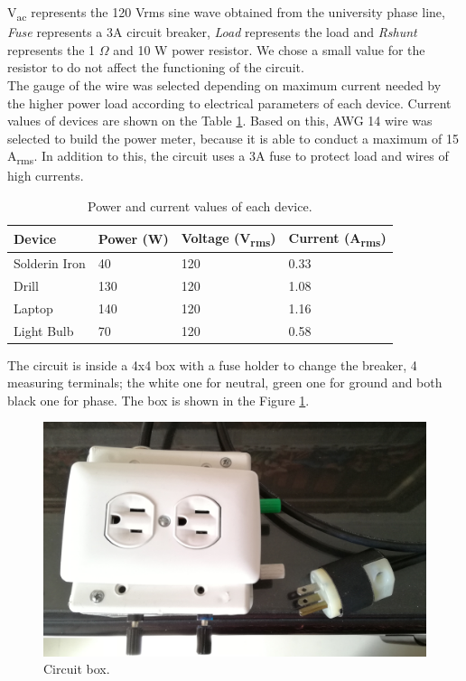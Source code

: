 \documentclass[journal]{IEEEtran}
\begin{document}
V\textsubscript{ac} represents the 120 Vrms sine wave 
obtained from the university phase line, \textit{Fuse}
represents a 3A circuit breaker, \textit{Load} represents 
the load and \textit{Rshunt} 
represents the 1 $\Omega$ and 10 W 
power resistor. We chose a small value for the resistor 
to do not affect the functioning of the circuit. \\

The gauge of the wire was selected depending on maximum 
current needed by the higher power load according to 
electrical parameters 
of each device. Current values of devices are 
shown on the Table \ref{current_table}. Based on this, 
AWG 14 wire was selected to build the power meter, because 
it is able to conduct a maximum of 15 A\textsubscript{rms}.
In addition to this, the circuit uses a 3A fuse to protect
load and wires of high currents.\\

\begin{table}
\centering
\caption{Power and current values of each device.}
\begin{tabular}{|l|p{1.2cm}|p{1.5cm}|p{1.5cm}|}
\hline 
Device & Power (W) & Voltage (V\textsubscript{rms}) 
& Current (A\textsubscript{rms}) \\ \hline 
Solderin Iron 	&  40	& 120 	& 0.33 \\ \hline 
Drill 		& 130	& 120   & 1.08 \\ \hline 
Laptop 		& 140 	& 120   & 1.16 \\ \hline 
Light Bulb		& 70  	& 120   & 0.58 \\ \hline 
\end{tabular}
\label{current_table}
\end{table}

The circuit is inside a 4x4 box with a fuse holder to 
change the breaker, 4 measuring terminals; the white 
one for neutral, green one for ground and 
both black one for phase. The box is shown in the 
Figure \ref{circuit_box}. \\

\begin{figure}[h]
\centering
\includegraphics[clip,width=\columnwidth]{circuit_box.png}
\caption{Circuit box.}
\label{circuit_box}
\end{figure}
\end{document}
